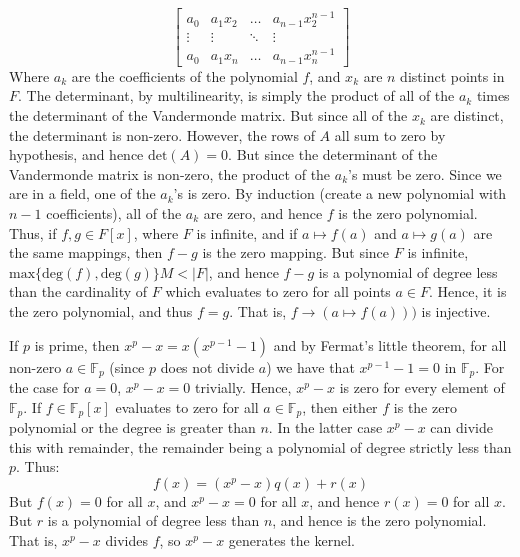 \documentclass{article}                                                        %
\begin{document}
\begin{solution}
\begin{equation}
\begin{bmatrix}
                a_{0}&a_{1}x_{2}&\dots&a_{n-1}x_{2}^{n-1}\\
                \vdots&\vdots&\ddots&\vdots\\
                a_{0}&a_{1}x_{n}&\dots&a_{n-1}x_{n}^{n-1}
            \end{bmatrix}
        \end{equation}
        Where $a_{k}$ are the coefficients of the polynomial $f$, and
        $x_{k}$ are $n$ distinct points in $F$. The determinant, by
        multilinearity, is simply the product of all of the $a_{k}$ times the
        determinant of the Vandermonde matrix. But since all of the $x_{k}$
        are distinct, the determinant is non-zero. However, the rows of $A$ all
        sum to zero by hypothesis, and hence $\textrm{det}(A)=0$. But since the
        determinant of the Vandermonde matrix is non-zero, the product of the
        $a_{k}$'s must be zero. Since we are in a field, one of the $a_{k}$'s is
        zero. By induction (create a new polynomial with $n-1$ coefficients),
        all of the $a_{k}$ are zero, and hence $f$ is the zero polynomial.
        Thus, if $f,g\in{F}[x]$, where $F$ is infinite, and if
        $a\mapsto{f}(a)$ and $a\mapsto{g}(a)$ are the same mappings, then
        $f-g$ is the zero mapping. But since $F$ is infinite,
        $\textrm{max}\{\textrm{deg}(f),\textrm{deg}(g)\}M<|F|$, and hence
        $f-g$ is a polynomial of degree less than the cardinality of $F$ which
        evaluates to zero for all points $a\in{F}$. Hence, it is the zero
        polynomial, and thus $f=g$. That is, $f\rightarrow(a\mapsto{f}(a)))$ is
        injective.
        \par\hfill\par
        If $p$ is prime, then $x^{p}-x=x(x^{p-1}-1)$ and by Fermat's little
        theorem, for all non-zero $a\in\mathbb{F}_{p}$ (since $p$ does not
        divide $a$) we have that $x^{p-1}-1=0$ in $\mathbb{F}_{p}$. For the case
        for $a=0$, $x^{p}-x=0$ trivially. Hence, $x^{p}-x$ is zero for every
        element of $\mathbb{F}_{p}$. If $f\in\mathbb{F}_{p}[x]$ evaluates to
        zero for all $a\in\mathbb{F}_{p}$, then either $f$ is the zero
        polynomial or the degree is greater than $n$. In the latter case
        $x^{p}-x$ can divide this with remainder, the remainder being a
        polynomial of degree strictly less than $p$. Thus:
        \begin{equation}
            f(x)=(x^{p}-x)q(x)+r(x)
        \end{equation}
        But $f(x)=0$ for all $x$, and $x^{p}-x=0$ for all $x$, and hence
        $r(x)=0$ for all $x$. But $r$ is a polynomial of degree less than $n$,
        and hence is the zero polynomial. That is, $x^{p}-x$ divides $f$, so
        $x^{p}-x$ generates the kernel.
    \end{solution}
\end{document}
